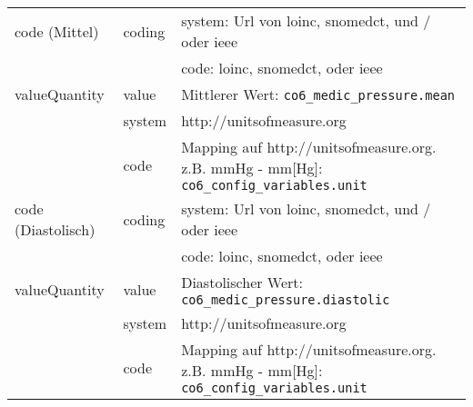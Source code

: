 \begin{longtable}{|l|l|p{7cm}|}
	code (Mittel)  & coding & system: Url von \ac{loinc}, \ac{snomedct}, und / oder \ac{ieee} \\ 
	\cline{3-3} 
	&  & code: \ac{loinc}, \ac{snomedct}, oder \ac{ieee} \\ \hline	
	valueQuantity & value & Mittlerer Wert: \texttt{co6\_medic\_pressure.mean} \\
	\cline{2-3}
	& system & http://unitsofmeasure.org \\ 
	\cline{2-3}
	& code & Mapping auf http://unitsofmeasure.org. z.B. mmHg - mm[Hg]: \texttt{co6\_config\_variables.unit} \\ \hline
	code (Diastolisch)  & coding & system: Url von \ac{loinc}, \ac{snomedct}, und / oder \ac{ieee} \\ 
	\cline{3-3} 
	&  & code: \ac{loinc}, \ac{snomedct}, oder \ac{ieee} \\ \hline	
	valueQuantity & value & Diastolischer Wert: \texttt{co6\_medic\_pressure.diastolic} \\
	\cline{2-3}
	& system & http://unitsofmeasure.org \\ 
	\cline{2-3}
	& code & Mapping auf http://unitsofmeasure.org. z.B. mmHg - mm[Hg]: \texttt{co6\_config\_variables.unit} \\ \hline
\end{longtable}
\clearpage
